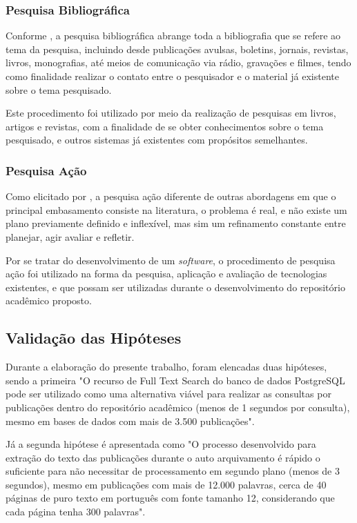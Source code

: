 \subsubsection{Pesquisa Bibliográfica}

Conforme \citep[p. 183]{LAKATOS2003:metodologia}, a pesquisa bibliográfica
abrange toda a bibliografia que se refere ao tema da pesquisa,
incluindo desde publicações avulsas, boletins, jornais, revistas,
livros, monografias, até meios de comunicação via rádio,
gravações e filmes, tendo como finalidade realizar o contato
entre o pesquisador e o material já existente sobre o tema pesquisado.

Este procedimento foi utilizado por meio da realização de pesquisas
em livros, artigos e revistas, com a finalidade de se obter
conhecimentos sobre o tema pesquisado, e outros sistemas
já existentes com propósitos semelhantes.

\subsubsection{Pesquisa Ação}

Como elicitado por \citep[p. 45]{LOVATO:metodologia}, a pesquisa ação
diferente de outras abordagens em que o principal
embasamento consiste na literatura, o problema é real, e não existe
um plano previamente definido e inflexível, mas sim um refinamento
constante entre planejar, agir avaliar e refletir.

Por se tratar do desenvolvimento de um \emph{software}, o procedimento
de pesquisa ação foi utilizado na forma da pesquisa,
aplicação e avaliação de tecnologias existentes, e que possam
ser utilizadas durante o desenvolvimento do repositório
acadêmico proposto.

\subsection{Validação das Hipóteses}

Durante a elaboração do presente trabalho, foram elencadas
duas hipóteses, sendo a primeira "O recurso de Full Text
Search do banco de dados PostgreSQL pode ser utilizado como
uma alternativa viável para realizar as consultas por publicações
dentro do repositório acadêmico (menos de 1 segundos por consulta),
mesmo em bases de dados com mais de 3.500 publicações".

Já a segunda hipótese é apresentada como "O processo desenvolvido
para extração do texto das publicações durante o auto arquivamento
é rápido o suficiente para não necessitar de processamento em segundo
plano (menos de 3 segundos), mesmo em publicações com mais de 12.000 palavras,
cerca de 40 páginas de puro texto em português com fonte tamanho 12, considerando
que cada página tenha 300 palavras".

